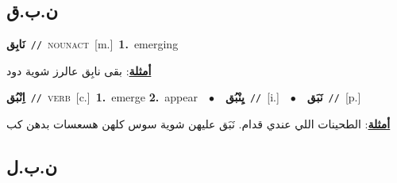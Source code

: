 \documentclass[10pt,a4paper,twoside]{article} %
\begin{document}
\begin{multicols}{2}
{{{{{\vspace{-3mm}
\subsection*{\color{blue}\foreignlanguage{arabic}{ن.ب.ق}\color{blue}{}} 

{\setlength\topsep{0pt}\textbf{\foreignlanguage{arabic}{نَابِق}}\ {\color{gray}\texttt{//}\color{black}}\ \textsc{noun\textunderscore act}\ [m.]\ \textbf{1.}~emerging\  \begin{flushright}\color{gray}\foreignlanguage{arabic}{\textbf{\underline{\foreignlanguage{arabic}{أمثلة}}}: بقى نابِق عالرز شوية دود}\end{flushright}\color{black}} \vspace{2mm}

{\setlength\topsep{0pt}\textbf{\foreignlanguage{arabic}{اِنْبُق}}\ {\color{gray}\texttt{//}\color{black}}\ \textsc{verb}\ [c.]\ \textbf{1.}~emerge  \textbf{2.}~appear\ \ $\bullet$\ \ \setlength\topsep{0pt}\textbf{\foreignlanguage{arabic}{يِنْبُق}}\ {\color{gray}\texttt{//}\color{black}}\ [i.]\ \ $\bullet$\ \ \setlength\topsep{0pt}\textbf{\foreignlanguage{arabic}{نَبَق}}\ {\color{gray}\texttt{//}\color{black}}\ [p.]\  \begin{flushright}\color{gray}\foreignlanguage{arabic}{\textbf{\underline{\foreignlanguage{arabic}{أمثلة}}}: الطحينات اللي عندي قدام. نَبَق عليهن شوية سوس كلهن هسعسات بدهن كب}\end{flushright}\color{black}} \vspace{2mm}

\vspace{-3mm}
\subsection*{\color{blue}\foreignlanguage{arabic}{ن.ب.ل}\color{blue}{}} 

}}}}}
\end{multicols}
\end{document}
